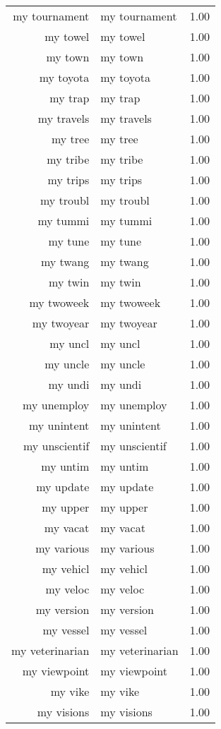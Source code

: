 \begin{table}[ht]
\begin{tabular}{rlr}
  my tournament & my tournament & 1.00 \\ 
  my towel & my towel & 1.00 \\ 
  my town & my town & 1.00 \\ 
  my toyota & my toyota & 1.00 \\ 
  my trap & my trap & 1.00 \\ 
  my travels & my travels & 1.00 \\ 
  my tree & my tree & 1.00 \\ 
  my tribe & my tribe & 1.00 \\ 
  my trips & my trips & 1.00 \\ 
  my troubl & my troubl & 1.00 \\ 
  my tummi & my tummi & 1.00 \\ 
  my tune & my tune & 1.00 \\ 
  my twang & my twang & 1.00 \\ 
  my twin & my twin & 1.00 \\ 
  my twoweek & my twoweek & 1.00 \\ 
  my twoyear & my twoyear & 1.00 \\ 
  my uncl & my uncl & 1.00 \\ 
  my uncle & my uncle & 1.00 \\ 
  my undi & my undi & 1.00 \\ 
  my unemploy & my unemploy & 1.00 \\ 
  my unintent & my unintent & 1.00 \\ 
  my unscientif & my unscientif & 1.00 \\ 
  my untim & my untim & 1.00 \\ 
  my update & my update & 1.00 \\ 
  my upper & my upper & 1.00 \\ 
  my vacat & my vacat & 1.00 \\ 
  my various & my various & 1.00 \\ 
  my vehicl & my vehicl & 1.00 \\ 
  my veloc & my veloc & 1.00 \\ 
  my version & my version & 1.00 \\ 
  my vessel & my vessel & 1.00 \\ 
  my veterinarian & my veterinarian & 1.00 \\ 
  my viewpoint & my viewpoint & 1.00 \\ 
  my vike & my vike & 1.00 \\ 
  my visions & my visions & 1.00 \\ 

\end{tabular}
\end{table}
